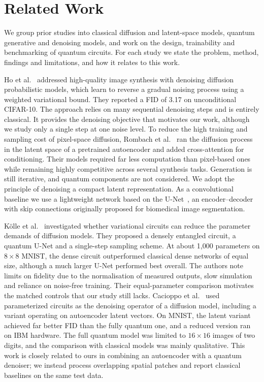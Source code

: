 \section{Related Work}\label{sec:related}
We group prior studies into classical diffusion and latent-space models, quantum generative and denoising models, and work on the design, trainability and benchmarking of quantum circuits. For each study we state the problem, method, findings and limitations, and how it relates to this work.

Ho et al.~\cite{ho} addressed high-quality image synthesis with denoising diffusion probabilistic models, which learn to reverse a gradual noising process using a weighted variational bound. They reported a FID of 3.17 on unconditional CIFAR-10. The approach relies on many sequential denoising steps and is entirely classical. It provides the denoising objective that motivates our work, although we study only a single step at one noise level. To reduce the high training and sampling cost of pixel-space diffusion, Rombach et al.~\cite{rombach} ran the diffusion process in the latent space of a pretrained autoencoder and added cross-attention for conditioning. Their models required far less computation than pixel-based ones while remaining highly competitive across several synthesis tasks. Generation is still iterative, and quantum components are not considered. We adopt the principle of denoising a compact latent representation. As a convolutional baseline we use a lightweight network based on the U-Net~\cite{unet}, an encoder--decoder with skip connections originally proposed for biomedical image segmentation.

K\"olle et al.~\cite{kolle} investigated whether variational circuits can reduce the parameter demands of diffusion models. They proposed a densely entangled circuit, a quantum U-Net and a single-step sampling scheme. At about 1,000 parameters on $8\times8$ MNIST, the dense circuit outperformed classical dense networks of equal size, although a much larger U-Net performed best overall. The authors note limits on fidelity due to the normalisation of measured outputs, slow simulation and reliance on noise-free training. Their equal-parameter comparison motivates the matched controls that our study still lacks. Cacioppo et al.~\cite{cacioppo} used parameterized circuits as the denoising operator of a diffusion model, including a variant operating on autoencoder latent vectors. On MNIST, the latent variant achieved far better FID than the fully quantum one, and a reduced version ran on IBM hardware. The full quantum model was limited to $16\times16$ images of two digits, and the comparison with classical models was mainly qualitative. This work is closely related to ours in combining an autoencoder with a quantum denoiser; we instead process overlapping spatial patches and report classical baselines on the same test data.

